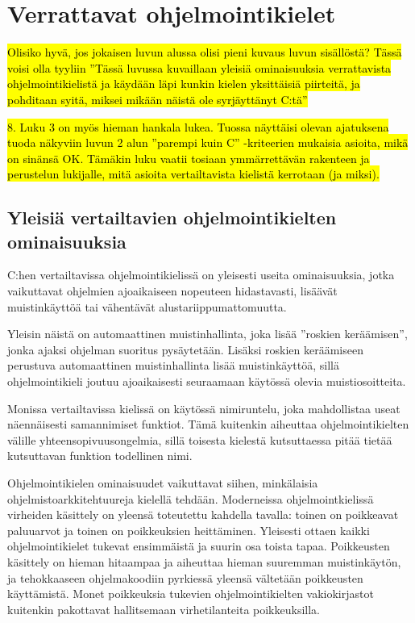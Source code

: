 \section{Verrattavat ohjelmointikielet}

\hl{Olisiko hyvä, jos jokaisen luvun alussa olisi pieni kuvaus luvun
sisällöstä? Tässä voisi olla tyyliin ''Tässä luvussa kuvaillaan yleisiä
ominaisuuksia verrattavista ohjelmointikielistä ja käydään läpi kunkin kielen
yksittäisiä piirteitä, ja pohditaan syitä, miksei mikään näistä ole
syrjäyttänyt C:tä''}

\hl{8. Luku 3 on myös hieman hankala lukea. Tuossa näyttäisi olevan ajatuksena
tuoda näkyviin luvun 2 alun ''parempi kuin C'' -kriteerien mukaisia asioita, mikä
on sinänsä OK. Tämäkin luku vaatii tosiaan ymmärrettävän rakenteen ja
perustelun lukijalle, mitä asioita vertailtavista kielistä kerrotaan (ja
miksi).}

\subsection{Yleisiä vertailtavien ohjelmointikielten ominaisuuksia}

C:hen vertailtavissa ohjelmointikielissä on yleisesti useita ominaisuuksia,
jotka vaikuttavat ohjelmien ajoaikaiseen nopeuteen hidastavasti, lisäävät
muistinkäyttöä tai vähentävät alustariippumattomuutta.

Yleisin näistä on automaattinen muistinhallinta, joka lisää ''roskien
keräämisen'', jonka ajaksi ohjelman suoritus
pysäytetään. Lisäksi roskien keräämiseen perustuva automaattinen
muistinhallinta lisää muistinkäyttöä, sillä ohjelmointikieli joutuu
ajoaikaisesti seuraamaan käytössä olevia muistiosoitteita.

Monissa vertailtavissa kielissä on käytössä nimiruntelu,
joka mahdollistaa useat näennäisesti samannimiset funktiot. Tämä kuitenkin
aiheuttaa ohjelmointikielten välille yhteensopivuusongelmia, sillä toisesta
kielestä kutsuttaessa pitää tietää kutsuttavan funktion todellinen nimi.

Ohjelmointikielen ominaisuudet vaikuttavat siihen, minkälaisia
ohjelmistoarkkitehtuureja kielellä tehdään\citationneeded. Moderneissa
ohjelmointkielissä virheiden käsittely on yleensä toteutettu kahdella tavalla:
toinen on poikkeavat paluuarvot ja toinen on poikkeuksien heittäminen.
Yleisesti ottaen kaikki ohjelmointikielet tukevat ensimmäistä ja suurin osa
toista tapaa. Poikkeusten käsittely on hieman hitaampaa ja aiheuttaa hieman
suuremman muistinkäytön, ja tehokkaaseen ohjelmakoodiin pyrkiessä yleensä
vältetään poikkeusten käyttämistä\citationneeded. Monet poikkeuksia tukevien
ohjelmointikielten vakiokirjastot kuitenkin pakottavat hallitsemaan
virhetilanteita poikkeuksilla.

